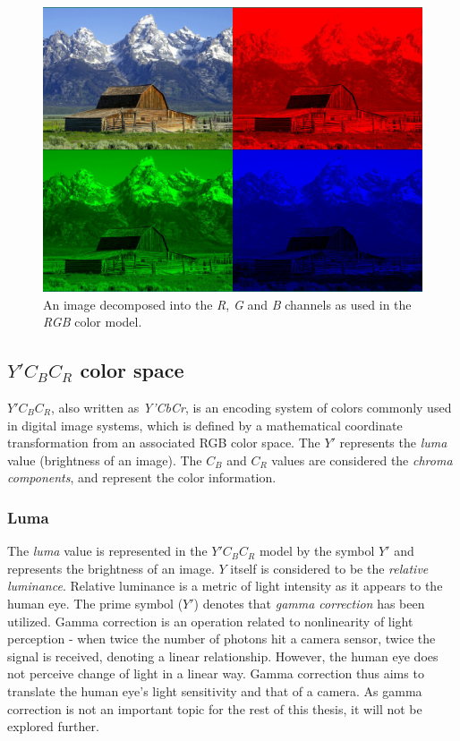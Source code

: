 \documentclass[thesis=M,english]{FITthesis}[2012/10/20]
\begin{document}
\begin{figure}[h]
  \centering
  \includegraphics[scale=0.5]{imgs/house-rgbdecomp}
  \caption[Image decomposed in its RGB channels]{An image decomposed into the \emph{R}, \emph{G} and \emph{B} channels
           as used in the \emph{RGB} color model.}
  \label{fig:house-rgbdecomp}
\end{figure}

\subsection{$Y'C_{B}C_{R}$ color space}
$Y'C_BC_R$, also written as \emph{Y'CbCr}, is an encoding system of colors commonly
used in digital image systems, which is defined by a mathematical coordinate
transformation from an associated RGB color space. The $Y'$ represents the
\emph{luma} value (brightness of an image). The $C_{B}$ and $C_{R}$ values
are considered the \emph{chroma components}, and represent the color information.


\subsubsection{Luma}
The \emph{luma} value is represented in the $Y'C_{B}C_{R}$ model by the symbol $Y'$
and represents the brightness of an image. $Y$ itself is considered to be the \emph{relative
luminance}. Relative luminance is a metric of light intensity as it appears to the human eye.
The prime symbol ($Y'$) denotes that \emph{gamma correction} has been utilized. Gamma correction
is an operation related to nonlinearity of light perception - when twice the number of
photons hit a camera sensor, twice the signal is received, denoting a linear relationship.
However, the human eye does not perceive change of light in a linear way. Gamma correction
thus aims to translate the human eye's light sensitivity and that of a camera. \cite{img:gamma}
As gamma correction is not an important topic for the rest of this thesis, it will not be
explored further.
\end{document}
